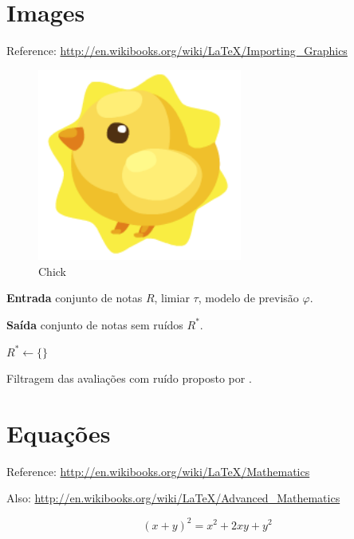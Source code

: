 \section{Images}\label{sec:LABEL_CHP_2_SEC_B}
Reference: \url{http://en.wikibooks.org/wiki/LaTeX/Importing_Graphics}

\begin{figure}
  \centering
  \includegraphics[width=0.6\textwidth]{imagens/chick.png}
  \caption{Chick}
  \label{fig:LABEL_FIG_1}
\end{figure}

\begin{algorithm}[H]

\textbf{Entrada} conjunto de notas $R$, limiar $\tau$, modelo de previsão $\varphi$.

\textbf{Saída} conjunto de notas sem ruídos $R^{*}$.

$R^{*} \gets \{\}$

\caption{Filtragem das avaliações com ruído proposto por \cite{OMahony2006}.}
\label{alg:mahony}
\end{algorithm}

\section{Equações}
Reference: \url{http://en.wikibooks.org/wiki/LaTeX/Mathematics}

Also: \url{http://en.wikibooks.org/wiki/LaTeX/Advanced_Mathematics}

\begin{equation}
  (x + y)^2 = x^2 + 2xy + y^2
  \label{eq:LABEL_EQ_1}
\end{equation}

